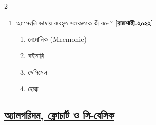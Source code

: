 \begin{multicols}{2}
\begin{enumerate}
\item অ্যাসেম্বলি ভাষায় ব্যবহৃত সংকেতকে কী বলে? \textbf{[রাজশাহী-২০২২]}
\begin{enumerate}[label=\alph*)]
\item নেমোনিক (Mnemonic) \checkmark
\item বাইনারি
\item ডেসিমেল
\item হেক্সা
\end{enumerate}

\end{enumerate}
\end{multicols}

\subsection*{\textbf{\underline{অ্যালগরিদম, ফ্লোচার্ট ও সি-বেসিক}}}

